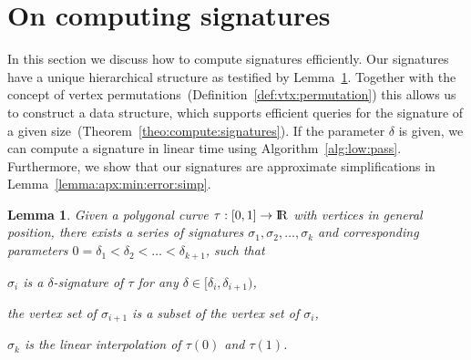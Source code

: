 \documentclass[11pt, letter]{article}
\newtheorem{lemma}[theorem]{Lemma}
\newcommand{\seclab}[1]{\label{sec:#1}}
\newcommand{\thmref}[1]{Theorem~\ref{theo:#1}}
\newcommand{\lemlab}[1]{\label{lemma:#1}}
\newcommand{\lemref}[1]{Lemma~\ref{lemma:#1}}
\newcommand{\defref}[1]{Definition~\ref{def:#1}}
\newcommand{\algref}[1]{Algorithm~\ref{alg:#1}}
\renewcommand{\Re}{{\rm I\!\hspace{-0.025em} R}}
\begin{document}
\section{On computing signatures}
\seclab{computing:signatures}

In this section we discuss how to compute signatures efficiently. Our signatures have a unique hierarchical structure as testified by \lemref{canonical:signature}.  Together with the concept of vertex permutations~(\defref{vtx:permutation}) this allows us to construct a data structure, which supports efficient queries for the signature of a given size~(\thmref{compute:signatures}).  If the parameter $\delta$ is given, we can compute a signature in linear time using \algref{low:pass}. Furthermore, we show that our signatures are approximate simplifications in \lemref{apx:min:error:simp}. 


\begin{lemma}\lemlab{canonical:signature}
Given a polygonal curve $\tau:[0,1]\rightarrow\Re$ with vertices in general position, there exists a
series of signatures $\sigma_1,\sigma_2,\dots,\sigma_k$ and corresponding parameters
$0 = \delta_1 < \delta_2 < \dots < \delta_{k+1}$, such that 
\begin{compactenum}[(i)]
\item $\sigma_i$ is a $\delta$-signature of $\tau$ for any $\delta \in [\delta_i,\delta_{i+1})$, 
\item the vertex set of $\sigma_{i+1}$ is a subset of the vertex set of $\sigma_{i}$,
\item $\sigma_k$ is the linear interpolation of $\tau(0)$ and $\tau(1)$.
\end{compactenum}
\end{lemma}
\end{document}
